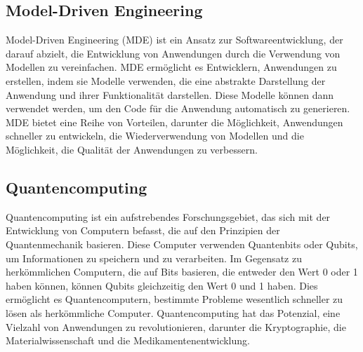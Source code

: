 \subsection{Model-Driven Engineering}
Model-Driven Engineering (MDE) ist ein Ansatz zur Softwareentwicklung, der darauf abzielt,
die Entwicklung von Anwendungen durch die Verwendung von Modellen zu vereinfachen. MDE
ermöglicht es Entwicklern, Anwendungen zu erstellen, indem sie Modelle verwenden, die
eine abstrakte Darstellung der Anwendung und ihrer Funktionalität darstellen. Diese
Modelle können dann verwendet werden, um den Code für die Anwendung automatisch zu
generieren. MDE bietet eine Reihe von Vorteilen, darunter die Möglichkeit, Anwendungen
schneller zu entwickeln, die Wiederverwendung von Modellen und die Möglichkeit, die
Qualität der Anwendungen zu verbessern.

\subsection{Quantencomputing}
Quantencomputing ist ein aufstrebendes Forschungsgebiet, das sich mit der Entwicklung von
Computern befasst, die auf den Prinzipien der Quantenmechanik basieren. Diese Computer
verwenden Quantenbits oder Qubits, um Informationen zu speichern und zu verarbeiten. Im
Gegensatz zu herkömmlichen Computern, die auf Bits basieren, die entweder den Wert 0 oder
1 haben können, können Qubits gleichzeitig den Wert 0 und 1 haben. Dies ermöglicht es
Quantencomputern, bestimmte Probleme wesentlich schneller zu lösen als herkömmliche
Computer. Quantencomputing hat das Potenzial, eine Vielzahl von Anwendungen zu
revolutionieren, darunter die Kryptographie, die Materialwissenschaft und die
Medikamentenentwicklung.


